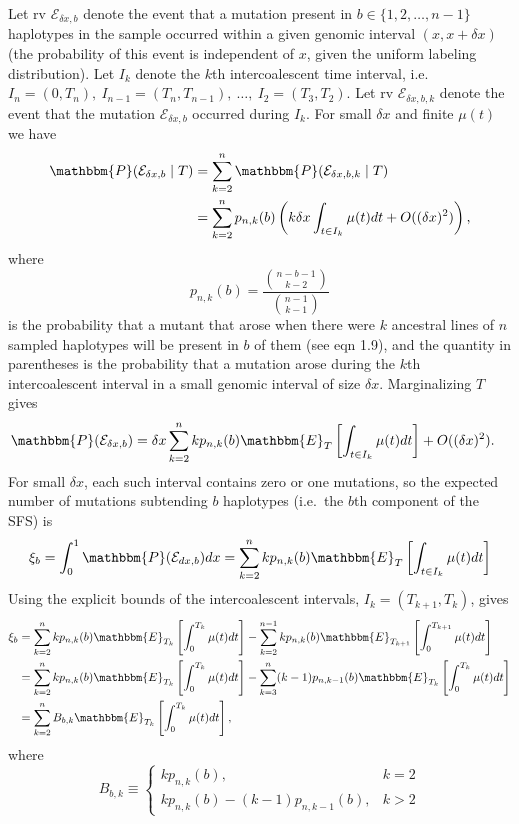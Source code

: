 \documentclass[11pt]{article}
\begin{document}
Let rv $\mathcal{E}_{\delta x, b}$ denote the event that a mutation present in $b\in\{1, 2, \dots, n-1\}$ haplotypes in the sample occurred within a given genomic interval $(x,x+\delta x)$ (the probability of this event is independent of $x$, given the uniform labeling distribution).
Let $I_k$ denote the $k$th intercoalescent time interval, i.e.\ $I_n = (0, T_n),\ I_{n-1} = (T_n, T_{n-1}),\ \dots,\ I_2 = (T_3, T_2)$.
Let rv $\mathcal{E}_{\delta x, b, k}$ denote the event that the mutation $\mathcal{E}_{\delta x, b}$ occurred during $I_k$.
For small $\delta x$ and finite $\mu(t)$ we have
\begin{align*}
\mathbbm{P}(\mathcal{E}_{\delta x, b}\mid T) &= \sum_{k=2}^n \mathbbm{P}(\mathcal{E}_{\delta x, b, k}\mid T)\\
&= \sum_{k=2}^n p_{n,k}(b)\left(k\delta x\int_{t\in I_k}\mu(t)dt + O((\delta x)^2)\right),
\end{align*}
where
\begin{equation}
\label{eqn:p}
p_{n,k}(b) = \frac{\binom{n-b-1}{k-2}}{\binom{n-1}{k-1}}
\end{equation}
is the probability that a mutant that arose when there were $k$ ancestral lines of $n$ sampled haplotypes will be present in $b$ of them (see \cite{Griffiths1998-qf} eqn 1.9), and the quantity in parentheses is the probability that a mutation arose during the $k$th intercoalescent interval in a small genomic interval of size $\delta x$.
Marginalizing $T$ gives
\begin{align*}
\mathbbm{P}(\mathcal{E}_{\delta x, b}) &= \delta x\sum_{k=2}^n k p_{n,k}(b) \mathbbm{E}_T\left[\int_{t\in I_k}\mu(t)dt\right] + O((\delta x)^2).
\end{align*}
For small $\delta x$, each such interval contains zero or one mutations, so the expected number of mutations subtending $b$ haplotypes (i.e.\ the $b$th component of the SFS) is
\[
\xi_b = \int_0^1 \mathbbm{P}(\mathcal{E}_{dx, b})dx = \sum_{k=2}^n k p_{n,k}(b)\mathbbm{E}_T\left[\int_{t\in I_k}\mu(t)dt\right]\nonumber
\]
Using the explicit bounds of the intercoalescent intervals, $I_{k} = (T_{k+1}, T_k)$, gives
\begin{align}
\label{eqn:xi}
\xi_b &= \sum_{k=2}^n k p_{n,k}(b) \mathbbm{E}_{T_k}\left[\int_0^{T_k}\mu(t)dt\right] - \sum_{k=2}^{n-1} k p_{n,k}(b) \mathbbm{E}_{T_{k+1}}\left[\int_0^{T_{k+1}}\mu(t)dt\right]\nonumber\\
&= \sum_{k=2}^n k p_{n,k}(b) \mathbbm{E}_{T_k}\left[\int_0^{T_k}\mu(t)dt\right] - \sum_{k=3}^{n} (k-1) p_{n,k-1}(b) \mathbbm{E}_{T_{k}}\left[\int_0^{T_k}\mu(t)dt\right]\nonumber\\
&= \sum_{k=2}^n B_{b,k} \mathbbm{E}_{T_k}\left[\int_0^{T_k}\mu(t)dt\right],
\end{align}
where
\begin{equation}
\label{eqn:B}
B_{b,k}\equiv
\begin{cases}
k p_{n,k}(b),& k=2\\
k p_{n,k}(b) - (k-1) p_{n,k-1}(b),& k > 2
\end{cases}
\end{equation}
\end{document}
